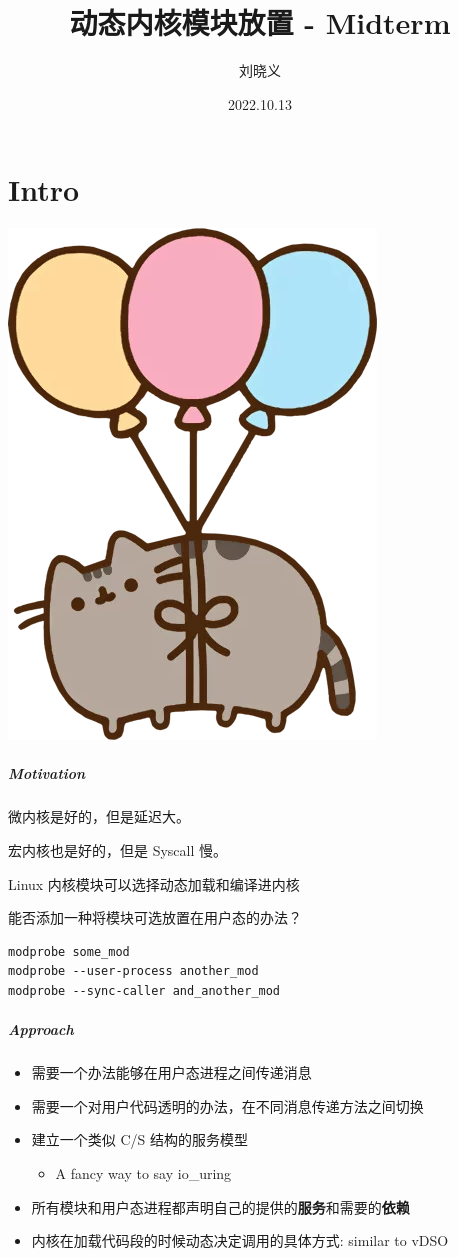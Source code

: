 \documentclass[UTF-8]{ctexbeamer}
\title{动态内核模块放置 - Midterm}
\author{刘晓义}
\date{2022.10.13}
\begin{document}
\part{Intro}

\begin{frame}
  \titlepage
  \begin{center}
    \includegraphics[width=.1\textwidth]{assets/float.png}
  \end{center}
\end{frame}

\begin{frame}[fragile]
  \frametitle{Motivation}

  微内核是好的，但是延迟大。

  \pause

  宏内核也是好的，但是 Syscall 慢。

  \pause

  \vspace*{1em}

  Linux 内核模块可以选择动态加载和编译进内核
  
  \pause
  
  能否添加一种将模块可选放置在用户态的办法？

  \begin{verbatim}
modprobe some_mod
modprobe --user-process another_mod
modprobe --sync-caller and_another_mod
  \end{verbatim}
\end{frame}

\begin{frame}
  \frametitle{Approach}

  \begin{itemize}
    \item 需要一个办法能够在用户态进程之间传递消息
    \item 需要一个对用户代码透明的办法，在不同消息传递方法之间切换
  \end{itemize}

  \pause
  \vspace*{1em}

  \begin{itemize}
    \item 建立一个类似 C/S 结构的服务模型
    \begin{itemize}
      \item A fancy way to say io\_uring
    \end{itemize}
    \item 所有模块和用户态进程都声明自己的提供的\textbf{服务}和需要的\textbf{依赖}
    \item 内核在加载代码段的时候动态决定调用的具体方式: similar to vDSO
  \end{itemize}
\end{frame}
\end{document}
